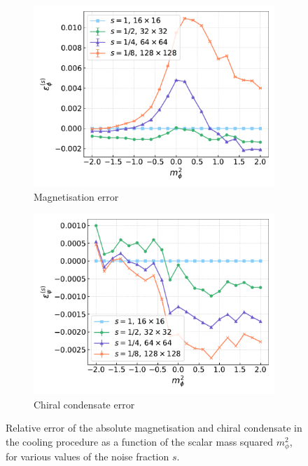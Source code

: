 \begin{figure}[htp]
    \centering
    \begin{subfigure}[b]{0.47\textwidth}
        \includegraphics[width=1.0\textwidth]{figures/cooling/mass_scan/deviation.pdf}
        \caption{Magnetisation error}
    \end{subfigure}
    \begin{subfigure}[b]{0.47\textwidth}
        \includegraphics[width=1.0\textwidth]{figures/cooling/mass_scan/deviation_cond.pdf}
        \caption{Chiral condensate error}
    \end{subfigure}
    \caption[Relative error in the cooling procedure at tree level as a function of the scalar mass squared.]{Relative error of the absolute magnetisation and chiral condensate in the cooling procedure as a function of the scalar mass squared $m_\phi^2$, for various values of the noise fraction $s$.}
    \label{fig:cooling_deviation}
\end{figure}
